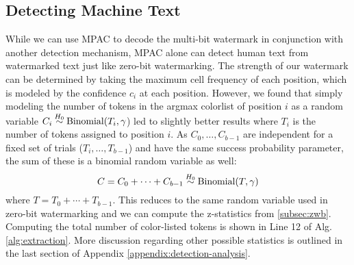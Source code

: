 \subsection{Detecting Machine Text}\label{subsec:detection}
While we can use MPAC to decode the multi-bit watermark in conjunction with another detection mechanism, MPAC alone can detect human text from watermarked text just like zero-bit watermarking. The strength of our watermark can be determined by taking the maximum cell frequency of each position, which is modeled by the confidence $c_i$ at each position. However, we found that simply modeling the number of tokens in the argmax colorlist of position $i$ as a random variable $C_i \distas{H_0} \text{Binomial}(T_i, \gamma$) led to slightly better results where $T_i$ is the number of tokens assigned to position $i$. 
As $C_0, \dots, C_{b-1}$ are independent for a fixed set of trials ($T_i, \dots, T_{b-1}$) and have the same success probability parameter, the sum of these is a binomial random variable as well:
\begin{equation}\label{eq:zero-bit-detection}
    C = C_0 + \cdots + C_{b-1} \distas{H_0} \text{Binomial}(T, \gamma)
\end{equation}
where $T=T_{0}+\cdots+T_{b-1}$. This reduces to the same random variable used in zero-bit watermarking and we can compute the z-statistics from \cref{subsec:zwb}. 
Computing the total number of color-listed tokens is shown in Line 12 of Alg. \ref{alg:extraction}. More discussion regarding other possible statistics is outlined in the last section of Appendix \ref{appendix:detection-analysis}. 



